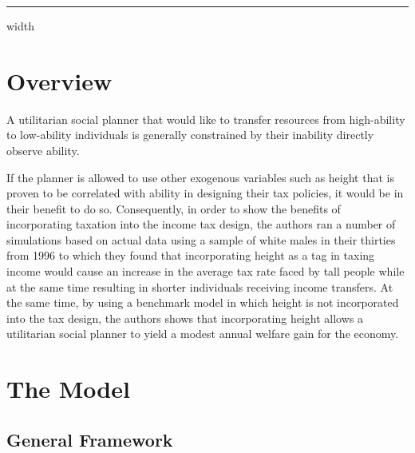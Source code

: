 \documentclass[titlepage]{\econtex}
\begin{document}
\titlepagefinish



\hrule height 0.4pt depth 0.0pt width \textwidth \relax

\medskip \medskip

\hypertarget{Overview}{}
\section{Overview}

A utilitarian social planner that would like to transfer resources from high-ability to low-ability individuals is generally constrained by their inability directly observe ability.

If the planner is allowed to use other exogenous variables such as  height that is proven to be correlated with ability in designing their tax policies, it would be in their benefit to do so.
Consequently, in order to show the benefits of incorporating taxation into the income tax design, the authors ran a number of simulations based on actual data using a sample of white males in their thirties from 1996 to which they found that incorporating  height as a tag in taxing income would cause an increase in the average tax rate faced by tall people while at the same time resulting in shorter individuals receiving income transfers. At the same time, by using a benchmark model in which height is not incorporated into the tax design, the authors shows that incorporating height allows a  utilitarian social planner to  yield a modest annual welfare gain for the economy.

\hypertarget{The Model}{}
\section{The Model}

\hypertarget{General Framework}{}
\subsection{General Framework}
\end{document}
